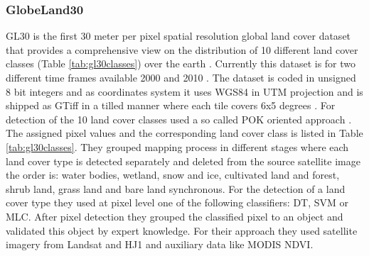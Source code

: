 		\subsubsection{GlobeLand30}
			\ac{GL30} is the first 30 meter per pixel spatial resolution global land cover dataset that provides a comprehensive view on the distribution of 10 different land cover classes (Table \ref{tab:gl30classes}) over the earth \citep{Chen2017}. Currently this dataset is for two different time frames available 2000 and 2010 \citep{Chen2015}. The dataset is coded in unsigned 8 bit integers and as coordinates system it uses \ac{WGS84} in \ac{UTM} projection and is shipped as \ac{GTiff} in a tilled manner where each tile covers 6x5 degrees \citep{Chen2014}. For detection of the 10 land cover classes \citeauthor{Chen2015} used a so called \ac{POK} oriented approach \citep{Chen2015}. The assigned pixel values and the corresponding land cover class is listed in Table \ref{tab:gl30classes}. They grouped mapping process in different stages where each land cover type is detected separately and deleted from the source satellite image the order is: water bodies, wetland, snow and ice, cultivated land and forest, shrub land, grass land and bare land synchronous. For the detection of a land cover type they used at pixel level one of the following classifiers: \ac{DT}, \ac{SVM} or \ac{MLC}. After pixel detection they grouped the classified pixel to an object and validated this object by expert knowledge. For their approach they used satellite imagery from Landsat and HJ1 and auxiliary data like MODIS NDVI.
